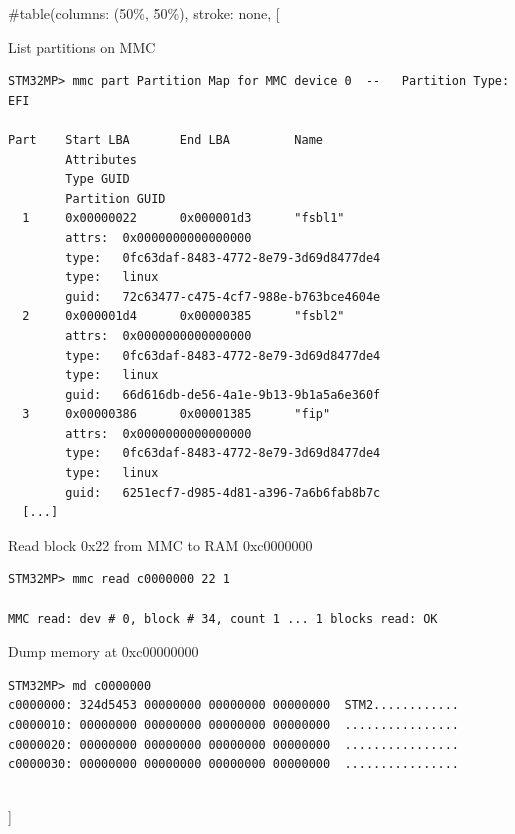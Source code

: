 #table(columns: (50\%, 50\%), stroke: none,
[
    \begin{block}{List partitions on MMC}
      {\tiny
\begin{verbatim}
STM32MP> mmc part Partition Map for MMC device 0  --   Partition Type: EFI

Part    Start LBA       End LBA         Name
        Attributes
        Type GUID
        Partition GUID
  1     0x00000022      0x000001d3      "fsbl1"
        attrs:  0x0000000000000000
        type:   0fc63daf-8483-4772-8e79-3d69d8477de4
        type:   linux
        guid:   72c63477-c475-4cf7-988e-b763bce4604e
  2     0x000001d4      0x00000385      "fsbl2"
        attrs:  0x0000000000000000
        type:   0fc63daf-8483-4772-8e79-3d69d8477de4
        type:   linux
        guid:   66d616db-de56-4a1e-9b13-9b1a5a6e360f
  3     0x00000386      0x00001385      "fip"
        attrs:  0x0000000000000000
        type:   0fc63daf-8483-4772-8e79-3d69d8477de4
        type:   linux
        guid:   6251ecf7-d985-4d81-a396-7a6b6fab8b7c
  [...]
\end{verbatim}
      }
    \end{block}

    \begin{block}{Read block 0x22 from MMC to RAM 0xc0000000}
      {\tiny
\begin{verbatim}
STM32MP> mmc read c0000000 22 1

MMC read: dev # 0, block # 34, count 1 ... 1 blocks read: OK
\end{verbatim}
      }
    \end{block}

    \begin{block}{Dump memory at 0xc00000000}
      {\tiny
\begin{verbatim}
STM32MP> md c0000000
c0000000: 324d5453 00000000 00000000 00000000  STM2............
c0000010: 00000000 00000000 00000000 00000000  ................
c0000020: 00000000 00000000 00000000 00000000  ................
c0000030: 00000000 00000000 00000000 00000000  ................
\end{verbatim}
      }
    \end{block}
  \\]


